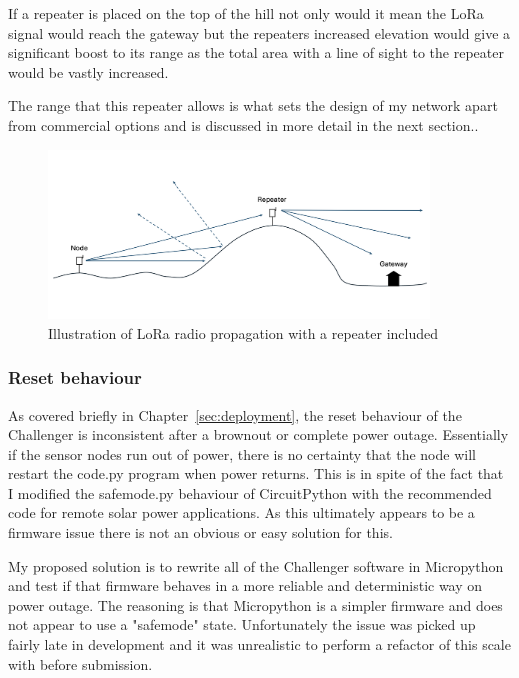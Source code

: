 If a repeater is placed on the top of the hill not only would it mean the LoRa
signal would reach the gateway but the repeaters increased elevation would give
a significant boost to its range as the total area with a line of sight to the
repeater would be vastly increased.

The range that this repeater allows is what sets the design of my network apart
from commercial options and is discussed in more detail in the next section..

\begin{figure}[H]
  \centering
  \includegraphics[width=0.9\textwidth]{contents/part-4/fig4/repeater.png}
  \caption{Illustration of LoRa radio propagation with a repeater included}
  \label{fig:repeater}
\end{figure}

\subsubsection{Reset behaviour}\label{sec:reset-behaviour}

As covered briefly in Chapter~\ref{sec:deployment}, the reset behaviour of the
Challenger is inconsistent after a brownout or complete power outage.
Essentially if the sensor nodes run out of power, there is no certainty that the
node will restart the code.py program when power returns. This is in spite of
the fact that I modified the safemode.py behaviour of CircuitPython with the
recommended code for remote solar power applications. As this ultimately appears
to be a firmware issue there is not an obvious or easy solution for this.

My proposed solution is to rewrite all of the Challenger software in Micropython
and test if that firmware behaves in a more reliable and deterministic way on
power outage. The reasoning is that Micropython is a simpler firmware and does
not appear to use a "safemode" state. Unfortunately the issue was picked up
fairly late in development and it was unrealistic to perform a refactor of this
scale with before submission.

